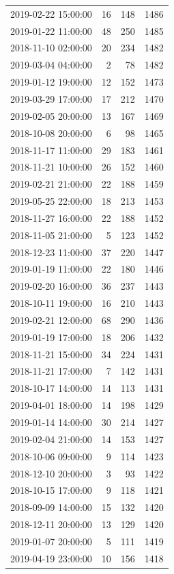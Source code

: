 \begin{tabular}{lrrr}
2019-02-22 15:00:00 & 16 & 148 & 1486 \\
2019-01-22 11:00:00 & 48 & 250 & 1485 \\
2018-11-10 02:00:00 & 20 & 234 & 1482 \\
2019-03-04 04:00:00 & 2 & 78 & 1482 \\
2019-01-12 19:00:00 & 12 & 152 & 1473 \\
2019-03-29 17:00:00 & 17 & 212 & 1470 \\
2019-02-05 20:00:00 & 13 & 167 & 1469 \\
2018-10-08 20:00:00 & 6 & 98 & 1465 \\
2018-11-17 11:00:00 & 29 & 183 & 1461 \\
2018-11-21 10:00:00 & 26 & 152 & 1460 \\
2019-02-21 21:00:00 & 22 & 188 & 1459 \\
2019-05-25 22:00:00 & 18 & 213 & 1453 \\
2018-11-27 16:00:00 & 22 & 188 & 1452 \\
2018-11-05 21:00:00 & 5 & 123 & 1452 \\
2018-12-23 11:00:00 & 37 & 220 & 1447 \\
2019-01-19 11:00:00 & 22 & 180 & 1446 \\
2019-02-20 16:00:00 & 36 & 237 & 1443 \\
2018-10-11 19:00:00 & 16 & 210 & 1443 \\
2019-02-21 12:00:00 & 68 & 290 & 1436 \\
2019-01-19 17:00:00 & 18 & 206 & 1432 \\
2018-11-21 15:00:00 & 34 & 224 & 1431 \\
2018-11-21 17:00:00 & 7 & 142 & 1431 \\
2018-10-17 14:00:00 & 14 & 113 & 1431 \\
2019-04-01 18:00:00 & 14 & 198 & 1429 \\
2019-01-14 14:00:00 & 30 & 214 & 1427 \\
2019-02-04 21:00:00 & 14 & 153 & 1427 \\
2018-10-06 09:00:00 & 9 & 114 & 1423 \\
2018-12-10 20:00:00 & 3 & 93 & 1422 \\
2018-10-15 17:00:00 & 9 & 118 & 1421 \\
2018-09-09 14:00:00 & 15 & 132 & 1420 \\
2018-12-11 20:00:00 & 13 & 129 & 1420 \\
2019-01-07 20:00:00 & 5 & 111 & 1419 \\
2019-04-19 23:00:00 & 10 & 156 & 1418 \\

\end{tabular}
